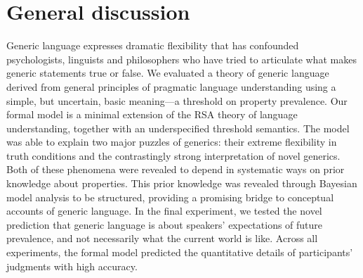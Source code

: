 \documentclass[12pt,letterpaper]{article}
\begin{document}
\section*{General discussion}

Generic language expresses dramatic flexibility that has confounded psychologists, linguists and philosophers who have tried to articulate what makes generic statements true or false. 
We evaluated a theory of generic language derived from general principles of pragmatic language understanding using a simple, but uncertain, basic meaning---a threshold on property prevalence.
Our formal model is a minimal extension of the RSA theory of language understanding, together with an underspecified threshold semantics.
The model was able to explain two major puzzles of generics: their extreme flexibility in truth conditions and the contrastingly strong interpretation of novel generics.
Both of these phenomena were revealed to depend in systematic ways on prior knowledge about properties.
This prior knowledge was revealed through Bayesian model analysis to be structured, providing a promising bridge to conceptual accounts of generic language.
In the final experiment, we tested the novel prediction that generic language is about speakers' expectations of future prevalence, and not necessarily what the current world is like. 
Across all experiments, the formal model predicted the quantitative details of participants' judgments with high accuracy.




\end{document}
